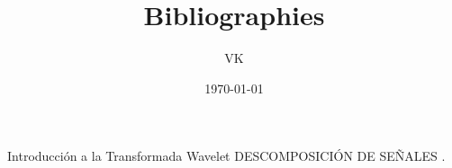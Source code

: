 \documentclass{article}
\title{Bibliographies}
\author{VK}
\date{\today}
\begin{document}
\maketitle

Introducción a la Transformada Wavelet DESCOMPOSICIÓN DE SEÑALES \cite{de2006introduccion}.

\newpage


\end{document}
